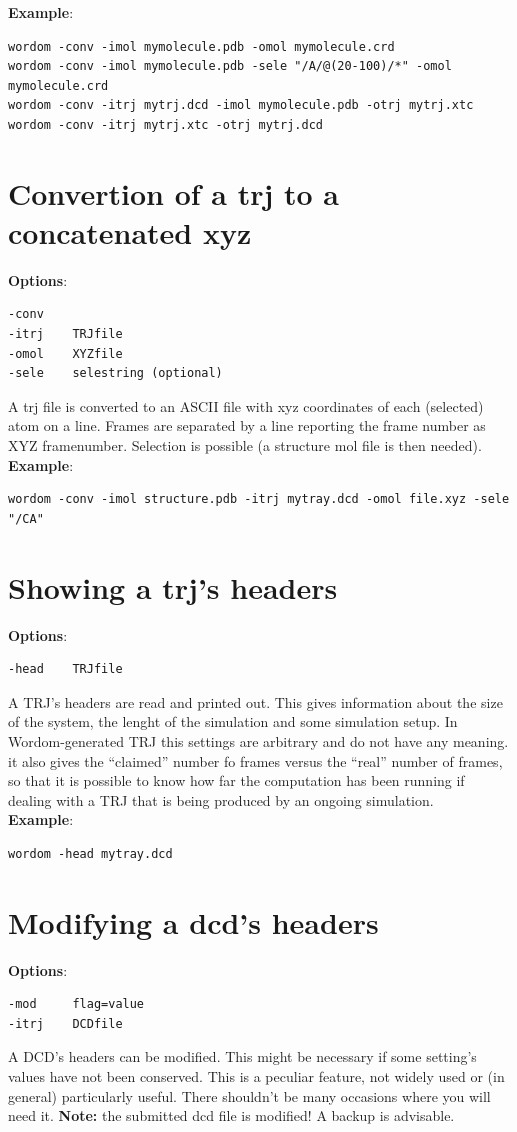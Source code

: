 \documentclass[11pt,twoside,onecolumn,a4paper,openright,notitlepage]{book}[2001/04/21]
\begin{document}
\textbf{\large Example}:
\begin{verbatim}
wordom -conv -imol mymolecule.pdb -omol mymolecule.crd
wordom -conv -imol mymolecule.pdb -sele "/A/@(20-100)/*" -omol mymolecule.crd
wordom -conv -itrj mytrj.dcd -imol mymolecule.pdb -otrj mytrj.xtc
wordom -conv -itrj mytrj.xtc -otrj mytrj.dcd
\end{verbatim}
%
\section{Convertion of a trj to a concatenated xyz}
\textbf{\large Options}:
\begin{verbatim}
-conv
-itrj    TRJfile
-omol    XYZfile
-sele    selestring (optional)
\end{verbatim}
A trj file is converted to an ASCII file with xyz coordinates of each (selected) atom on a line. Frames are separated by a line reporting the frame number as XYZ framenumber. Selection is possible (a structure mol file is then needed).\\

\textbf{\large Example}:
\begin{verbatim}
wordom -conv -imol structure.pdb -itrj mytray.dcd -omol file.xyz -sele "/CA"
\end{verbatim}
%
\section{Showing a trj's headers}
\textbf{\large Options}:
\begin{verbatim}
-head    TRJfile
\end{verbatim}
A TRJ's headers are read and printed out. This gives information about the size of the system, the lenght of the simulation and some simulation setup. In Wordom-generated TRJ this settings are arbitrary and do not have any meaning. it also gives the ``claimed'' number fo frames versus the ``real'' number of frames, so that it is possible to know how far the computation has been running if dealing with a TRJ that is being produced by an ongoing simulation.\\

\textbf{\large Example}:
\begin{verbatim}
wordom -head mytray.dcd
\end{verbatim}
%
\section{Modifying a dcd's headers}
\textbf{\large Options}:
\begin{verbatim}
-mod     flag=value
-itrj    DCDfile
\end{verbatim}
A DCD's headers can be modified. This might be necessary if some setting's values have not been conserved. This is a peculiar feature, not widely used or (in general) particularly useful. There shouldn't be many occasions where you will need it. {\bf Note:} the submitted dcd file is modified! A backup is advisable.\\
\end{document}
